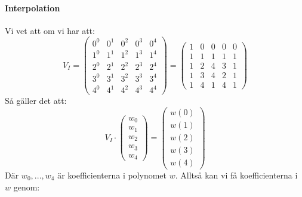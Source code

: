 \paragraph{Interpolation}
Vi vet att om vi har att:
\begin{equation*}
  V_I = \begin{pmatrix}
    0^0 & 0^1 & 0^2 & 0^3 & 0^4 \\
    1^0 & 1^1 & 1^2 & 1^3 & 1^4 \\
    2^0 & 2^1 & 2^2 & 2^3 & 2^4 \\
    3^0 & 3^1 & 3^2 & 3^3 & 3^4 \\
    4^0 & 4^1 & 4^2 & 4^3 & 4^4
  \end{pmatrix} =
  \begin{pmatrix}
    1 & 0 & 0 & 0 & 0 \\
    1 & 1 & 1 & 1 & 1 \\
    1 & 2 & 4 & 3 & 1 \\
    1 & 3 & 4 & 2 & 1 \\
    1 & 4 & 1 & 4 & 1
  \end{pmatrix}
\end{equation*}
Så gäller det att:
\begin{equation*}
  V_I \cdot \begin{pmatrix}
    w_0 \\
    w_1 \\
    w_2 \\
    w_3 \\
    w_4
  \end{pmatrix} =
  \begin{pmatrix}
    w(0) \\
    w(1) \\
    w(2) \\
    w(3) \\
    w(4)
  \end{pmatrix}
\end{equation*}
Där $w_0, ..., w_4$ är koefficienterna i polynomet $w$. Alltså kan vi få
koefficienterna i $w$ genom:
